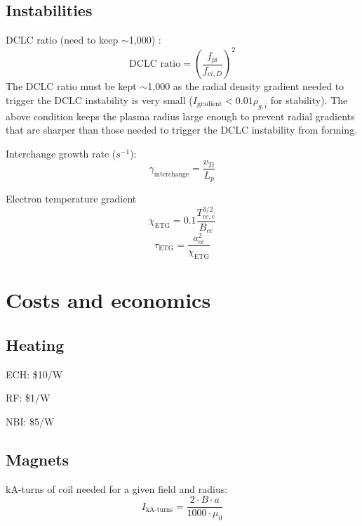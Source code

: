 \subsection{Instabilities}

DCLC ratio (need to keep $\sim$1,000) \cite{kotelnikov_chernoshtanov_prikhodko_2017,post_1966}:
\begin{equation}
    \text{DCLC ratio} = \left( \frac{f_{pi}}{f_{ci,D}} \right) ^2
\end{equation}
The DCLC ratio must be kept $\sim$1,000 as the radial density gradient needed to trigger the DCLC instability is very small ($I_{\text{gradient}}<0.01\rho_{g,i}$ for stability). The above condition keeps the plasma radius large enough to prevent radial gradients that are sharper than those needed to trigger the DCLC instability from forming.

Interchange growth rate ($s^{-1}$):
\begin{equation}
    \gamma_{\text{interchange}}=\frac{v_{Ti}}{L_p}
\end{equation}

Electron temperature gradient
\begin{equation}
    \chi_{\text{ETG}} = 0.1 \frac{T_{cc,e}^{3/2}}{B_{cc}}
\end{equation}
\begin{equation}
    \tau_{\text{ETG}} = \frac{a_{cc}^2}{\chi_{\text{ETG}}}
\end{equation}

\section{Costs and economics}

\subsection{Heating} 

ECH: \$10/W

RF: \$1/W

NBI: \$5/W

\subsection{Magnets} 

kA-turns of coil needed for a given field and radius:
\begin{equation}
    I_\text{kA-turns} = \frac{2 \cdot B \cdot a}{1000 \cdot \mu_0}
\end{equation}

